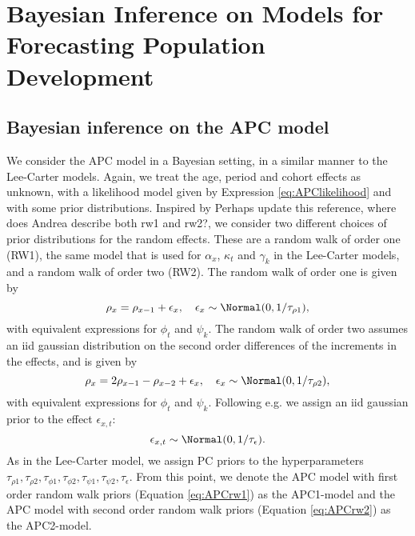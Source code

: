 \section{Bayesian Inference on Models for Forecasting Population Development}
\label{sec:BayesianInference}

\subsection{Bayesian inference on the APC model}
\label{sec:BayesianInferenceAPC}
We consider the APC model in a Bayesian setting, in a similar manner to the Lee-Carter models. Again, we treat the age, period and cohort effects as unknown, with a likelihood model given by Expression \ref{eq:APClikelihood} and with some prior distributions. Inspired by \parencite{RieblerThesis2010} \textcolor{myDarkGreen}{Perhaps update this reference, where does Andrea describe both rw1 and rw2?}, we consider two different choices of prior distributions for the random effects. These are a random walk of order one (RW1), the same model that is used for $\alpha_x$, $\kappa_t$ and $\gamma_k$ in the Lee-Carter models, and a random walk of order two (RW2). The random walk of order one is given by
\begin{equation}
    \rho_x = \rho_{x-1} + \epsilon_x, \quad \epsilon_x \sim \Normal(0,1/\tau_{\rho1}),
    \label{eq:APCrw1}
\end{equation}
with equivalent expressions for $\phi_t$ and $\psi_k$. The random walk of order two assumes an iid gaussian distribution on the second order differences of the increments in the effects, and is given by
\begin{equation}
    \rho_x = 2\rho_{x-1} - \rho_{x-2} + \epsilon_x, \quad \epsilon_x \sim \Normal(0, 1/\tau_{\rho2}),
    \label{eq:APCrw2}
\end{equation}
with equivalent expressions for $\phi_t$ and $\psi_k$. 
Following e.g. \textcite{Besag1995} we assign an iid gaussian prior to the effect $\epsilon_{x,t}$:
\begin{equation}
    \epsilon_{x,t} \sim \Normal(0,1/\tau_\epsilon).
\end{equation}
As in the Lee-Carter model, we assign PC priors to the hyperparameters $\tau_{\rho 1}, \tau_{\rho 2}, \tau_{\phi 1}, \tau_{\phi 2}, \tau_{\psi 1}, \tau_{\psi 2}, \tau_\epsilon$. From this point, we denote the APC model with first order random walk priors (Equation \ref{eq:APCrw1}) as the APC1-model and the APC model with second order random walk priors (Equation \ref{eq:APCrw2}) as the APC2-model.

